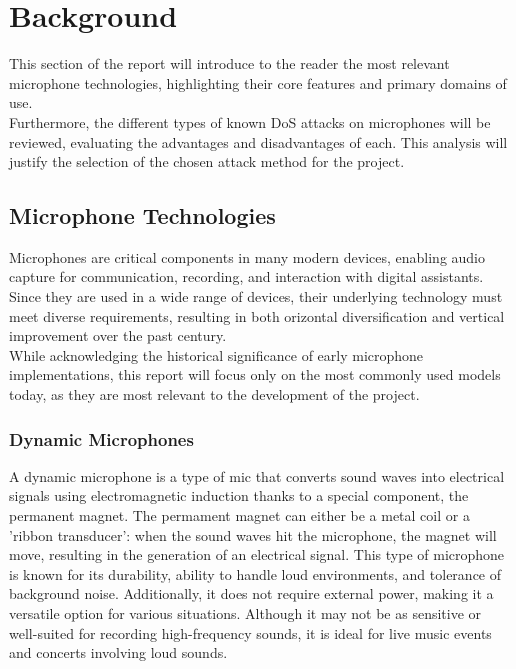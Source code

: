 \chapter{Background}
\label{background}
This section of the report will introduce to the reader the most relevant microphone technologies, highlighting their core features and primary domains of use.\\
Furthermore, the different types of known DoS attacks on microphones will be reviewed, evaluating the advantages and disadvantages of each. This analysis will justify the selection of the chosen attack method for the project.
\section{Microphone Technologies}
Microphones are critical components in many modern devices, enabling audio capture for communication, recording, and interaction with digital assistants.
Since they are used in a wide range of devices, their underlying technology must meet diverse requirements, resulting in both orizontal diversification and vertical improvement over the past century.\\
While acknowledging the historical significance of early microphone implementations, this report will focus only on the most commonly used models today, as they are most relevant to the development of the project.
\subsection{Dynamic Microphones}
A dynamic microphone is a type of mic that converts sound waves into electrical signals using electromagnetic induction thanks to a special component, the permanent magnet.
The permament magnet can either be a metal coil or a 'ribbon transducer': when the sound waves hit the microphone, the magnet will move, resulting in the generation of an electrical signal.
This type of microphone is known for its durability, ability to handle loud environments, and tolerance of background noise.
Additionally, it does not require external power, making it a versatile option for various situations.
Although it may not be as sensitive or well-suited for recording high-frequency sounds, it is ideal for live music events and concerts involving loud sounds.
